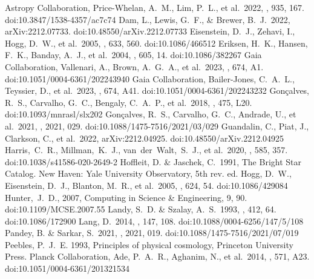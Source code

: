 \documentclass[modern]{aastex631}
\begin{document}
\begin{thebibliography}{dummy}
 Astropy Collaboration, Price-Whelan, A.~M., Lim, P.~L., et al.\ 2022, \apj, 935, 167. doi:10.3847/1538-4357/ac7c74
 Dam, L., Lewis, G.~F., \& Brewer, B.~J.\ 2022, arXiv:2212.07733. doi:10.48550/arXiv.2212.07733
 Eisenstein, D.~J., Zehavi, I., Hogg, D.~W., et al.\ 2005, \apj, 633, 560. doi:10.1086/466512
 Eriksen, H.~K., Hansen, F.~K., Banday, A.~J., et al.\ 2004, \apj, 605, 14. doi:10.1086/382267
 Gaia Collaboration, Vallenari, A., Brown, A.~G.~A., et al.\ 2023, \aap, 674, A1. doi:10.1051/0004-6361/202243940
 Gaia Collaboration, Bailer-Jones, C.~A.~L., Teyssier, D., et al.\ 2023, \aap, 674, A41. doi:10.1051/0004-6361/202243232
 Gon{\c{c}}alves, R.~S., Carvalho, G.~C., Bengaly, C.~A.~P., et al.\ 2018, \mnras, 475, L20. doi:10.1093/mnrasl/slx202
 Gon{\c{c}}alves, R.~S., Carvalho, G.~C., Andrade, U., et al.\ 2021, \jcap, 2021, 029. doi:10.1088/1475-7516/2021/03/029
 Guandalin, C., Piat, J., Clarkson, C., et al.\ 2022, arXiv:2212.04925. doi:10.48550/arXiv.2212.04925
 Harris,~C.~R., Millman,~K.~J., van~der~Walt,~S.~J., et al.\ 2020, \nat, 585, 357. doi:10.1038/s41586-020-2649-2
Hoffleit, D. \& Jaschek, C.\ 1991, The Bright Star Catalog. New Haven: Yale University Observatory, 5th rev. ed.
 Hogg, D.~W., Eisenstein, D.~J., Blanton, M.~R., et al.\ 2005, \apj, 624, 54. doi:10.1086/429084
 Hunter,~J.~D., 2007, Computing in Science \& Engineering, 9, 90. doi:10.1109/MCSE.2007.55
 Landy, S.~D. \& Szalay, A.~S.\ 1993, \apj, 412, 64. doi:10.1086/172900
 Lang, D.\ 2014, \aj, 147, 108. doi:10.1088/0004-6256/147/5/108
 Pandey, B. \& Sarkar, S.\ 2021, \jcap, 2021, 019. doi:10.1088/1475-7516/2021/07/019
 Peebles, P.~J.~E. 1993, Principles of physical cosmology, Princeton University Press.
 Planck Collaboration, Ade, P.~A.~R., Aghanim, N., et al.\ 2014, \aap, 571, A23. doi:10.1051/0004-6361/201321534

\end{thebibliography}
\end{document}
